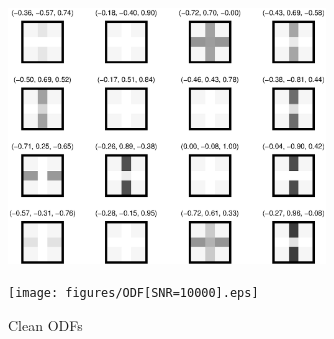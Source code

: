 \documentclass[10pt]{article}
\begin{document}
\begin{figure}[H]
  \centering
  \includegraphics[width=0.75\textwidth]{figures/DWI04.eps}
\end{figure}
\begin{figure}[H]
  \centering
  \texttt{[image: figures/ODF[SNR=10000].eps]}
  \caption{Clean ODFs}
\end{figure}

\clearpage
\end{document}
